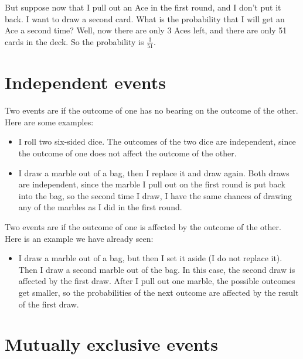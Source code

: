 \documentclass[../../../main.tex]{subfiles}
\begin{document}
But suppose now that I pull out an Ace in the first round, and I don't put it back. I want to draw a second card. What is the probability that I will get an Ace a second time? Well, now there are only 3 Aces left, and there are only 51 cards in the deck. So the probability is $\frac{3}{51}$.



\section{Independent events}

Two events are  if the outcome of one has no bearing on the outcome of the other. Here are some examples: 

\begin{itemize}

  \item I roll two six-sided dice. The outcomes of the two dice are independent, since the outcome of one does not affect the outcome of the other.
  
  \item I draw a marble out of a bag, then I replace it and draw again. Both draws are independent, since the marble I pull out on the first round is put back into the bag, so the second time I draw, I have the same chances of drawing any of the marbles as I did in the first round.
  
\end{itemize}

Two events are  if the outcome of one is affected by the outcome of the other. Here is an example we have already seen:

\begin{itemize}

  \item I draw a marble out of a bag, but then I set it aside (I do not replace it). Then I draw a second marble out of the bag. In this case, the second draw is affected by the first draw. After I pull out one marble, the possible outcomes get smaller, so the probabilities of the next outcome are affected by the result of the first draw.
  
\end{itemize}



\section{Mutually exclusive events}
\end{document}
